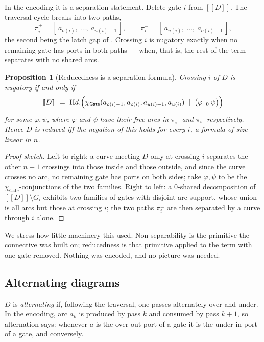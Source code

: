 \documentclass[11pt]{article}
\newtheorem{proposition}{Proposition}
\theoremstyle{definition}
\newcommand{\enc}[1]{[\![ #1 ]\!]}
\newcommand{\Gate}{\mathsf{Gate}}
\newcommand{\charf}[1]{\chi_{#1}}
\newcommand{\sep}{\mathbin{\vert}}
\newcommand{\ssep}[1]{\mathbin{\vert_{#1}}}
\newcommand{\Hq}{\mathrm{H}}
\begin{document}
In the encoding it is a separation statement. Delete gate $i$ from $\enc{D}$. The
traversal cycle breaks into two paths,
\[
\pi^{+}_i = [\,a_{o(i)},\ \dots,\ a_{u(i)-1}\,],
\qquad
\pi^{-}_i = [\,a_{u(i)},\ \dots,\ a_{o(i)-1}\,],
\]
the second being the latch gap of \cite[\S5]{knots}. Crossing $i$ is nugatory
exactly when no remaining gate has ports in both paths --- when, that is, the rest
of the term separates with no shared arcs.

\begin{proposition}[Reducedness is a separation formula]\label{prop:reduced}
Crossing $i$ of $D$ is nugatory if and only if
\[
\enc{D} \ \models\
\Hq \vec a.\Bigl(\charf{\Gate}(a_{o(i)-1},a_{o(i)},a_{u(i)-1},a_{u(i)})
\ \sep\ \bigl(\varphi \ssep{0} \psi\bigr)\Bigr)
\]
for some $\varphi, \psi$, where $\varphi$ and $\psi$ have their free arcs in
$\pi^{+}_i$ and $\pi^{-}_i$ respectively. Hence $D$ is reduced iff the negation of
this holds for every $i$, a formula of size linear in $n$.
\end{proposition}

\begin{proof}[Proof sketch]
Left to right: a curve meeting $D$ only at crossing $i$ separates the other $n-1$
crossings into those inside and those outside, and since the curve crosses no arc,
no remaining gate has ports on both sides; take $\varphi, \psi$ to be the
$\charf{\Gate}$-conjunctions of the two families. Right to left: a $0$-shared
decomposition of $\enc{D} \setminus G_i$ exhibits two families of gates with
disjoint arc support, whose union is all arcs but those at crossing $i$; the two
paths $\pi^{\pm}_i$ are then separated by a curve through $i$ alone.
\end{proof}

We stress how little machinery this used. Non-separability is the primitive the
connective was built on; reducedness is that primitive applied to the term with
one gate removed. Nothing was encoded, and no picture was needed.

\subsection{Alternating diagrams}\label{sec:alt}

$D$ is \emph{alternating} if, following the traversal, one passes alternately over
and under. In the encoding, arc $a_k$ is produced by pass $k$ and consumed by pass
$k+1$, so alternation says: whenever $a$ is the over-out port of a gate it is the
under-in port of a gate, and conversely.
\end{document}
